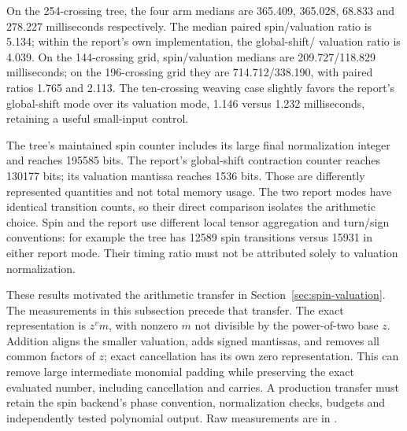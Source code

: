 

On the 254-crossing tree, the four arm medians are 365.409, 365.028,
68.833 and 278.227 milliseconds respectively. The median paired spin/valuation
ratio is 5.134; within the report's own implementation, the global-shift/
valuation ratio is 4.039. On the 144-crossing grid, spin/valuation medians
are 209.727/118.829 milliseconds; on the 196-crossing grid they are
714.712/338.190, with paired ratios 1.765 and 2.113. The ten-crossing weaving
case slightly favors the report's global-shift mode over its valuation mode,
1.146 versus 1.232 milliseconds, retaining a useful small-input control.

The tree's maintained spin counter includes its large final normalization
integer and reaches 195585 bits. The report's global-shift contraction
counter reaches 130177 bits; its valuation mantissa reaches 1536 bits.
Those are differently represented quantities and not total memory usage.
The two report modes have identical transition counts, so their direct
comparison isolates the arithmetic choice. Spin and the report use different
local tensor aggregation and turn/sign conventions: for example the tree
has 12589 spin transitions versus 15931 in either report mode. Their timing
ratio must not be attributed solely to valuation normalization.

These results motivated the arithmetic transfer in Section~\ref{sec:spin-valuation}.
The measurements in this subsection precede that transfer. The exact
representation is $z^v m$, with nonzero $m$ not divisible by the power-of-two
base $z$. Addition aligns the smaller valuation, adds signed mantissas, and
removes all common factors of $z$; exact cancellation has its own zero
representation. This can remove large intermediate monomial padding while
preserving the exact evaluated number, including cancellation and carries.
A production transfer must retain the spin backend's phase convention,
normalization checks, budgets and independently tested polynomial output.
Raw measurements are in .
